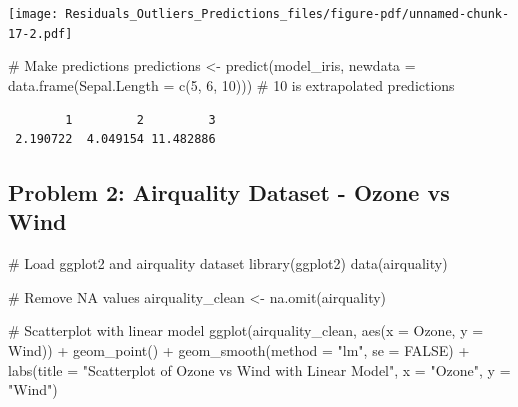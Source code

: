 \documentclass[
  letterpaper,
  DIV=11,
  numbers=noendperiod]{scrreprt}
\newenvironment{Shaded}{\begin{snugshade}}{\end{snugshade}}
\newcommand{\AttributeTok}[1]{\textcolor[rgb]{0.40,0.45,0.13}{#1}}
\newcommand{\CommentTok}[1]{\textcolor[rgb]{0.37,0.37,0.37}{#1}}
\newcommand{\ConstantTok}[1]{\textcolor[rgb]{0.56,0.35,0.01}{#1}}
\newcommand{\DecValTok}[1]{\textcolor[rgb]{0.68,0.00,0.00}{#1}}
\newcommand{\FunctionTok}[1]{\textcolor[rgb]{0.28,0.35,0.67}{#1}}
\newcommand{\NormalTok}[1]{\textcolor[rgb]{0.00,0.23,0.31}{#1}}
\newcommand{\OtherTok}[1]{\textcolor[rgb]{0.00,0.23,0.31}{#1}}
\newcommand{\SpecialCharTok}[1]{\textcolor[rgb]{0.37,0.37,0.37}{#1}}
\newcommand{\StringTok}[1]{\textcolor[rgb]{0.13,0.47,0.30}{#1}}
\begin{document}
\texttt{[image: Residuals\_Outliers\_Predictions\_files/figure-pdf/unnamed-chunk-17-2.pdf]}

\begin{Shaded}
\begin{Highlighting}[]
\CommentTok{\# Make predictions}
\NormalTok{predictions }\OtherTok{\textless{}{-}} \FunctionTok{predict}\NormalTok{(model\_iris, }\AttributeTok{newdata =} \FunctionTok{data.frame}\NormalTok{(}\AttributeTok{Sepal.Length =} \FunctionTok{c}\NormalTok{(}\DecValTok{5}\NormalTok{, }\DecValTok{6}\NormalTok{, }\DecValTok{10}\NormalTok{))) }\CommentTok{\# 10 is extrapolated}
\NormalTok{predictions}
\end{Highlighting}
\end{Shaded}

\begin{verbatim}
        1         2         3 
 2.190722  4.049154 11.482886 
\end{verbatim}

\subsection*{Problem 2: Airquality Dataset - Ozone vs
Wind}\label{problem-2-airquality-dataset---ozone-vs-wind-2}

\begin{Shaded}
\begin{Highlighting}[]
\CommentTok{\# Load ggplot2 and airquality dataset}
\FunctionTok{library}\NormalTok{(ggplot2)}
\FunctionTok{data}\NormalTok{(airquality)}

\CommentTok{\# Remove NA values}
\NormalTok{airquality\_clean }\OtherTok{\textless{}{-}} \FunctionTok{na.omit}\NormalTok{(airquality)}

\CommentTok{\# Scatterplot with linear model}
\FunctionTok{ggplot}\NormalTok{(airquality\_clean, }\FunctionTok{aes}\NormalTok{(}\AttributeTok{x =}\NormalTok{ Ozone, }\AttributeTok{y =}\NormalTok{ Wind)) }\SpecialCharTok{+}
  \FunctionTok{geom\_point}\NormalTok{() }\SpecialCharTok{+}
  \FunctionTok{geom\_smooth}\NormalTok{(}\AttributeTok{method =} \StringTok{"lm"}\NormalTok{, }\AttributeTok{se =} \ConstantTok{FALSE}\NormalTok{) }\SpecialCharTok{+}
  \FunctionTok{labs}\NormalTok{(}\AttributeTok{title =} \StringTok{"Scatterplot of Ozone vs Wind with Linear Model"}\NormalTok{, }\AttributeTok{x =} \StringTok{"Ozone"}\NormalTok{, }\AttributeTok{y =} \StringTok{"Wind"}\NormalTok{)}
\end{Highlighting}
\end{Shaded}
\end{document}

